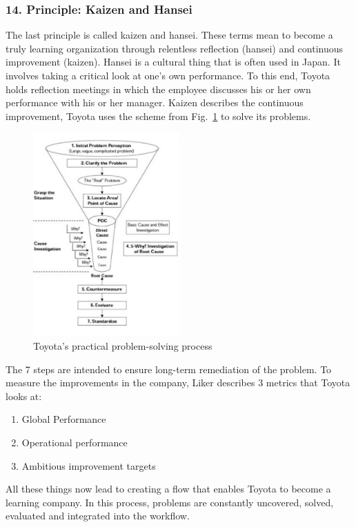 \documentclass[a4paper,11pt]{article}
\begin{document}
\subsubsection*{14. Principle: Kaizen and Hansei}

The last principle is called kaizen and hansei. These terms mean to become a
truly learning organization through relentless reflection (hansei) and
continuous improvement (kaizen). Hansei is a cultural thing that is often used
in Japan. It involves taking a critical look at one's own performance. To this
end, Toyota holds reflection meetings in which the employee discusses his or
her own performance with his or her manager. Kaizen describes the continuous
improvement, Toyota uses the scheme from Fig.~\ref{Problem} to solve its
problems.

\begin{figure}[h] 
  \centering
     \includegraphics[width=0.5\textwidth]{Problem.png}
  \caption{Toyota's practical problem-solving process}
  \label{Problem}
\end{figure}

The 7 steps are intended to ensure long-term remediation of the problem. To
measure the improvements in the company, Liker describes 3 metrics that Toyota
looks at:

\begin{enumerate}
\item Global Performance
\item Operational performance
\item Ambitious improvement targets
\end{enumerate}

All these things now lead to creating a flow that enables Toyota to become a
learning company. In this process, problems are constantly uncovered, solved,
evaluated and integrated into the workflow.
\end{document}
